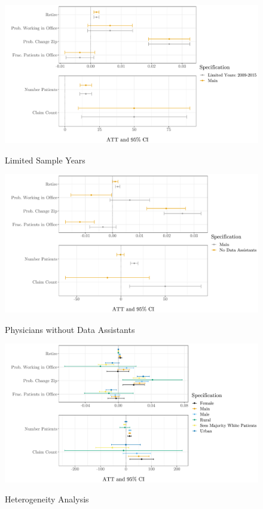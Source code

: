 \documentclass[11pt]{article}
\begin{document}
\begin{figure}[ht]
    \centering
    \caption{Limited Sample Years}
    \includegraphics[scale=.5]{Objects/years_graph.pdf}
    \label{fig:years}
\end{figure}

\begin{figure}[ht]
    \centering
    \caption{Physicians without Data Assistants}
    \includegraphics[scale=.57]{Objects/DA_graph.pdf}
    \label{fig:DA}
\end{figure}


\begin{figure}[ht]
    \centering
    \caption{Heterogeneity Analysis}
    \includegraphics[scale=.57]{Objects/heterogeneity _graph.pdf}
    \label{fig:het}
\end{figure}
\end{document}
